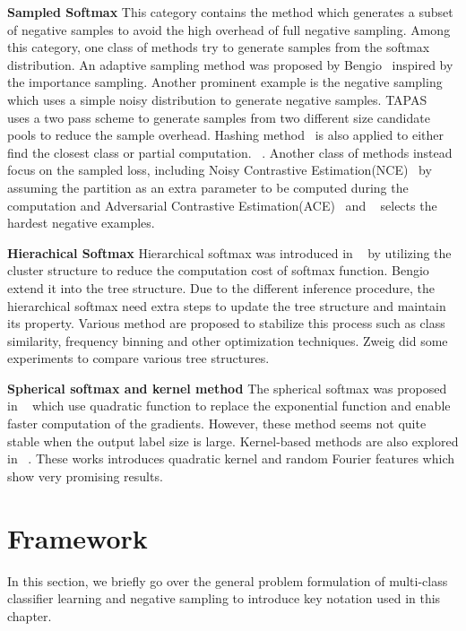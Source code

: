 \textbf{Sampled Softmax} This category contains the method which generates a subset of negative samples to avoid the high overhead of full negative sampling. Among this category, one class of methods try to generate samples from the softmax distribution. An adaptive sampling method was proposed by Bengio~\citep{bengio2008adaptive} inspired by the importance sampling. Another prominent example is the negative sampling~\citep{mikolov2013efficient} which uses a simple noisy distribution to generate negative samples. TAPAS~\citep{bai2017tapas} uses a two pass scheme to generate samples from two different size candidate pools to reduce the sample overhead. Hashing method~\citep{bakhtiary2015speeding, vijayanarasimhan2014deep} is also applied to either find the closest class or partial computation.  ~\citep{rawat2019sampled}. 
Another class of methods instead focus on the sampled loss, including Noisy Contrastive Estimation(NCE)~\citep{NCE} by assuming the partition as an extra parameter to be computed during the computation and Adversarial Contrastive Estimation(ACE)~\citep{bose2018adversarial} and ~\citep{schroff2015facenet,mussmann2017fast} selects the hardest negative examples.

\textbf{Hierachical Softmax}
Hierarchical softmax was introduced in ~\citep{Goodman} by utilizing the cluster structure to reduce the computation cost of softmax function. Bengio~\citep{morin2005hierarchical} extend it into the tree structure. Due to the different inference procedure, the hierarchical softmax need extra steps to update the tree structure and maintain its property. Various method are proposed to stabilize this process such as class similarity, frequency binning and other optimization techniques. Zweig did some experiments to compare various  tree structures. 

\textbf{Spherical softmax and kernel method}
The spherical softmax was proposed in ~\citep{vincent2015efficient,de2015exploration} which use quadratic function to replace the exponential function and enable faster computation of the gradients. However, these method seems not quite stable when the output label size is large. Kernel-based methods are also explored in ~\citep{blanc2017adaptive,rawat2019sampled}. These works introduces quadratic kernel and random Fourier features which show very promising results.
\section{Framework}
\label{sec:NS:framework}
In this section, we briefly go over the general problem formulation of multi-class classifier learning and negative sampling to introduce key notation used in this chapter.
